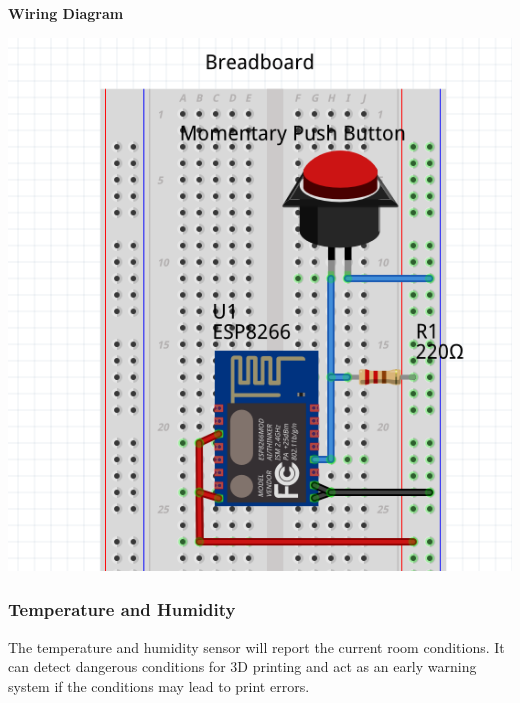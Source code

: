       \textbf{Wiring Diagram}\\
            \begin{center}
      \includegraphics[scale=0.3]{images/job-cir.png}
      \end{center}
    \subsubsection{Temperature and Humidity}
      The temperature and humidity sensor will report the current room conditions. It
      can detect dangerous conditions for 3D printing and act as an early warning system
      if the conditions may lead to print errors.\\

